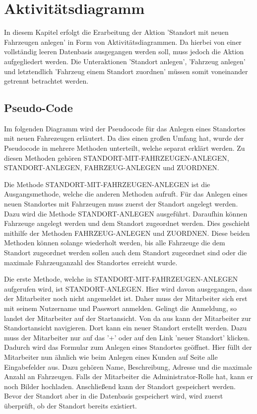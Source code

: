 \chapter{Aktivitätsdiagramm}

In diesem Kapitel erfolgt die Erarbeitung der Aktion 'Standort mit neuen Fahrzeugen anlegen' in Form von Aktivitätsdiagrammen. Da hierbei von einer vollständig leeren Datenbasis ausgegangen werden soll, muss jedoch die Aktion aufgegliedert werden. Die Unteraktionen 'Standort anlegen', 'Fahrzeug anlegen' und letztendlich 'Fahrzeug einem Standort zuordnen' müssen somit voneinander getrennt betrachtet werden. 

\section{Pseudo-Code}
Im folgenden Diagramm wird der Pseudocode für das Anlegen eines Standortes mit neuen Fahrezeugen erläutert. Da dies einen großen Umfang hat, wurde der Pseudocode in mehrere Methoden unterteilt, welche separat erklärt werden. Zu diesen Methoden gehören STANDORT-MIT-FAHRZEUGEN-ANLEGEN, STANDORT-ANLEGEN, FAHRZEUG-ANLEGEN und ZUORDNEN.

Die Methode STANDORT-MIT-FAHRZEUGEN-ANLEGEN ist die Ausgangsmethode, welche die anderen Methoden aufruft. Für das Anlegen eines neuen Standortes mit Fahrzeugen muss zuerst der Standort angelegt werden. Dazu wird die Methode STANDORT-ANLEGEN ausgeführt. Daraufhin können Fahrzeuge angelegt werden und dem Standort zugeordnet werden. Dies geschieht mithilfe der Methoden FAHRZEUG-ANLEGEN und ZUORDNEN. Diese beiden Methoden können solange wiederholt werden, bis alle Fahrzeuge die dem Standort zugeordnet werden sollen auch dem Standort zugeordnet sind oder die maximale Fahrzeuganzahl des Standortes erreicht wurde.


Die erste Methode, welche in STANDORT-MIT-FAHRZEUGEN-ANLEGEN aufgerufen wird, ist STANDORT-ANLEGEN. Hier wird davon ausgegangen, dass der Mitarbeiter noch nicht angemeldet ist. Daher muss der Mitarbeiter sich erst mit seinem Nutzername und Passwort anmelden. Gelingt die Anmeldung, so landet der Mitarbeiter auf der Startansicht. Von da aus kann der Mitarbeiter zur Standortansicht navigieren. Dort kann ein neuer Standort erstellt werden. Dazu muss der Mitarbeiter nur auf das '+' oder auf den Link 'neuer Standort' klicken. Dadurch wird das Formular zum Anlegen eines Standortes geöffnet. Hier füllt der Mitarbeiter nun ähnlich wie beim Anlegen eines Kunden auf Seite
\pageref{code:KundeAnlegen} alle Eingabefelder aus. Dazu gehören Name, Beschreibung, Adresse und die maximale Anzahl an Fahrzeugen. Falls der Mitarbeiter die Administrator-Rolle hat, kann er noch Bilder hochladen. Anschließend kann der Standort gespeichert werden. Bevor der Standort aber in die Datenbasis gespeichert wird, wird zuerst überprüft, ob der Standort bereits existiert.\label{code:StandortAnlegen}

